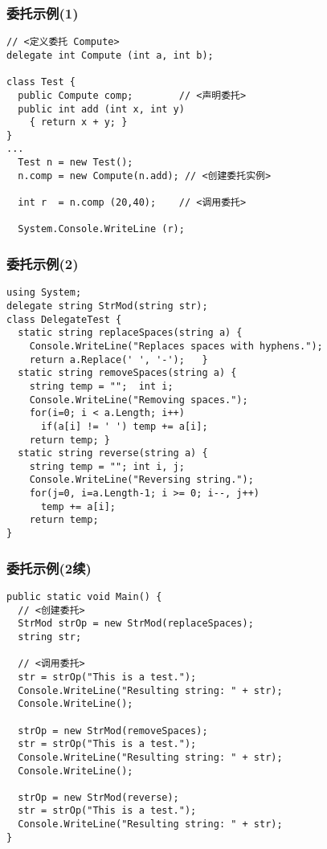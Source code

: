 \begin{frame}[fragile]
\frametitle{委托示例(1)}
\begin{lstlisting}[escapeinside=<>]
// <定义委托 Compute>
delegate int Compute (int a, int b);

class Test {
  public Compute comp;        // <声明委托>
  public int add (int x, int y)
    { return x + y; }
}
...
  Test n = new Test();
  n.comp = new Compute(n.add); // <创建委托实例>

  int r  = n.comp (20,40);    // <调用委托>

  System.Console.WriteLine (r);
\end{lstlisting}

\end{frame}

\begin{frame}[fragile]
\frametitle{委托示例(2)}
\begin{lstlisting}
using System;
delegate string StrMod(string str);
class DelegateTest {
  static string replaceSpaces(string a) {
    Console.WriteLine("Replaces spaces with hyphens.");
    return a.Replace(' ', '-');   }
  static string removeSpaces(string a) {
    string temp = "";  int i;
    Console.WriteLine("Removing spaces.");
    for(i=0; i < a.Length; i++)
      if(a[i] != ' ') temp += a[i];
    return temp; }
  static string reverse(string a) {
    string temp = ""; int i, j;
    Console.WriteLine("Reversing string.");
    for(j=0, i=a.Length-1; i >= 0; i--, j++)
      temp += a[i];
    return temp;
}
\end{lstlisting}
\end{frame}
\begin{frame}[fragile]
\frametitle{委托示例(2续)}
\begin{lstlisting}[escapeinside=<>]
public static void Main() {
  // <创建委托>
  StrMod strOp = new StrMod(replaceSpaces);
  string str;

  // <调用委托>
  str = strOp("This is a test.");
  Console.WriteLine("Resulting string: " + str);
  Console.WriteLine();

  strOp = new StrMod(removeSpaces);
  str = strOp("This is a test.");
  Console.WriteLine("Resulting string: " + str);
  Console.WriteLine();

  strOp = new StrMod(reverse);
  str = strOp("This is a test.");
  Console.WriteLine("Resulting string: " + str);
}

\end{lstlisting}
\end{frame}


